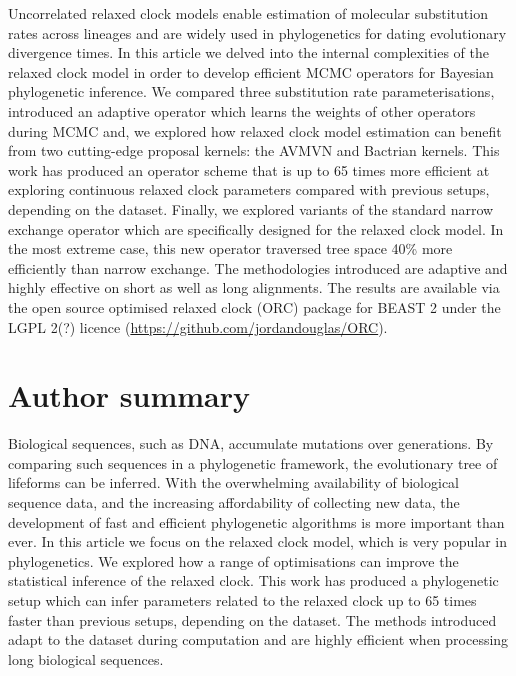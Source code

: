 \documentclass[10pt,letterpaper]{article}
\begin{document}
Uncorrelated relaxed clock models enable estimation of molecular substitution rates across lineages and are widely used in phylogenetics for dating evolutionary divergence times.
In this article we delved into the internal complexities of the relaxed clock model in order to develop efficient MCMC operators for Bayesian phylogenetic inference.
We compared three substitution rate parameterisations,  introduced an adaptive operator which learns the weights of other operators during MCMC and, we explored how relaxed clock model estimation can benefit from two cutting-edge proposal kernels: the AVMVN and Bactrian kernels.
This work has produced an operator scheme that is up to 65 times more efficient at exploring continuous relaxed clock parameters compared with previous setups, depending on the dataset. %
Finally, we explored variants of the standard narrow exchange operator which are specifically designed for the relaxed clock model.
In the most extreme case, this new operator traversed tree space 40\% more efficiently than narrow exchange.
The methodologies introduced are adaptive and highly effective on short as well as long alignments.
The results are available via the open source optimised relaxed clock (ORC) package for BEAST 2 under the LGPL 2(?) licence (\url{https://github.com/jordandouglas/ORC}).

\section*{Author summary}

Biological sequences, such as DNA, accumulate mutations over generations. 
By comparing such sequences in a phylogenetic framework, the evolutionary tree of lifeforms can be inferred.
With the overwhelming availability of biological sequence data, and the increasing affordability of collecting new data, the development of fast and efficient phylogenetic algorithms is more important than ever.
In this article we focus on the relaxed clock model, which is very popular in phylogenetics.
We explored how a range of optimisations can improve the statistical inference of the relaxed clock.
This work has produced a phylogenetic setup which can infer parameters related to the relaxed clock up to 65 times faster than previous setups, depending on the dataset. %
The methods introduced adapt to the dataset during computation and are highly efficient when processing long biological sequences.    
\end{document}
